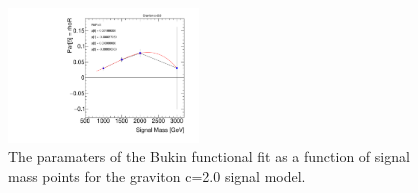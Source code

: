 \begin{figure}[!h]
\begin{center}
\includegraphics*[width=0.45\textwidth]{./figures/boosted/SigInterpolation/ParamFit_GhhC20_Bukin_Graviton_Para5_rhoR}
\caption{The paramaters of the Bukin functional fit as a function of signal mass points for the graviton c=2.0 signal model.}
\label{fig:boosted_siginter_bukinfitparam_c20}
\end{center}
\end{figure}
\FloatBarrier


